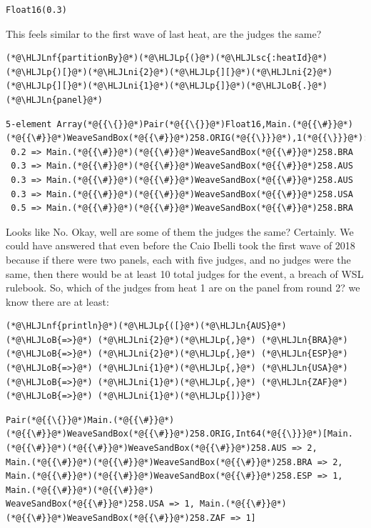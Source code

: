 \documentclass[12pt,a4paper]{article}
\newcommand{\HLJLn}[1]{#1}
\newcommand{\HLJLnf}[1]{\textcolor[RGB]{66,102,213}{#1}}
\newcommand{\HLJLsc}[1]{\textcolor[RGB]{201,61,57}{#1}}
\newcommand{\HLJLni}[1]{\textcolor[RGB]{59,151,46}{#1}}
\newcommand{\HLJLoB}[1]{\textcolor[RGB]{102,102,102}{\textbf{#1}}}
\newcommand{\HLJLp}[1]{#1}
\begin{document}
\begin{lstlisting}
Float16(0.3)
\end{lstlisting}


This feels similar to the first wave of last heat, are the judges the same?


\begin{lstlisting}
(*@\HLJLnf{partitionBy}@*)(*@\HLJLp{(}@*)(*@\HLJLsc{:heatId}@*)(*@\HLJLp{)[}@*)(*@\HLJLni{2}@*)(*@\HLJLp{][}@*)(*@\HLJLni{2}@*)(*@\HLJLp{][}@*)(*@\HLJLni{1}@*)(*@\HLJLp{]}@*)(*@\HLJLoB{.}@*)(*@\HLJLn{panel}@*)
\end{lstlisting}

\begin{lstlisting}
5-element Array(*@{{\{}}@*)Pair(*@{{\{}}@*)Float16,Main.(*@{{\#}}@*)(*@{{\#}}@*)WeaveSandBox(*@{{\#}}@*)258.ORIG(*@{{\}}}@*),1(*@{{\}}}@*):
 0.2 => Main.(*@{{\#}}@*)(*@{{\#}}@*)WeaveSandBox(*@{{\#}}@*)258.BRA
 0.3 => Main.(*@{{\#}}@*)(*@{{\#}}@*)WeaveSandBox(*@{{\#}}@*)258.AUS
 0.3 => Main.(*@{{\#}}@*)(*@{{\#}}@*)WeaveSandBox(*@{{\#}}@*)258.AUS
 0.3 => Main.(*@{{\#}}@*)(*@{{\#}}@*)WeaveSandBox(*@{{\#}}@*)258.USA
 0.5 => Main.(*@{{\#}}@*)(*@{{\#}}@*)WeaveSandBox(*@{{\#}}@*)258.BRA
\end{lstlisting}


Looks like No. Okay, well are some of them the judges the same? Certainly. We could have answered that even before the Caio Ibelli took the first wave of 2018 because if there were two panels, each with five judges, and no judges were the same, then there would be at least 10 total judges for the event, a breach of WSL rulebook. So, which of the judges from heat 1 are on the panel from round 2? we know there are at least:


\begin{lstlisting}
(*@\HLJLnf{println}@*)(*@\HLJLp{([}@*)(*@\HLJLn{AUS}@*) (*@\HLJLoB{=>}@*) (*@\HLJLni{2}@*)(*@\HLJLp{,}@*) (*@\HLJLn{BRA}@*) (*@\HLJLoB{=>}@*) (*@\HLJLni{2}@*)(*@\HLJLp{,}@*) (*@\HLJLn{ESP}@*) (*@\HLJLoB{=>}@*) (*@\HLJLni{1}@*)(*@\HLJLp{,}@*) (*@\HLJLn{USA}@*) (*@\HLJLoB{=>}@*) (*@\HLJLni{1}@*)(*@\HLJLp{,}@*) (*@\HLJLn{ZAF}@*) (*@\HLJLoB{=>}@*) (*@\HLJLni{1}@*)(*@\HLJLp{])}@*)
\end{lstlisting}

\begin{lstlisting}
Pair(*@{{\{}}@*)Main.(*@{{\#}}@*)(*@{{\#}}@*)WeaveSandBox(*@{{\#}}@*)258.ORIG,Int64(*@{{\}}}@*)[Main.(*@{{\#}}@*)(*@{{\#}}@*)WeaveSandBox(*@{{\#}}@*)258.AUS => 2, 
Main.(*@{{\#}}@*)(*@{{\#}}@*)WeaveSandBox(*@{{\#}}@*)258.BRA => 2, Main.(*@{{\#}}@*)(*@{{\#}}@*)WeaveSandBox(*@{{\#}}@*)258.ESP => 1, Main.(*@{{\#}}@*)(*@{{\#}}@*)
WeaveSandBox(*@{{\#}}@*)258.USA => 1, Main.(*@{{\#}}@*)(*@{{\#}}@*)WeaveSandBox(*@{{\#}}@*)258.ZAF => 1]
\end{lstlisting}
\end{document}
